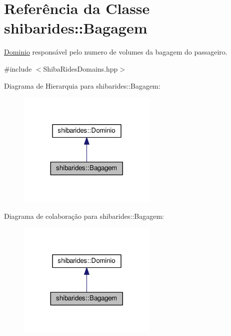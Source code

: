 \hypertarget{classshibarides_1_1Bagagem}{}\section{Referência da Classe shibarides\+:\+:Bagagem}
\label{classshibarides_1_1Bagagem}


\hyperlink{classshibarides_1_1Dominio}{Dominio} responsável pelo numero de volumes da bagagem do passageiro.  




{\ttfamily \#include $<$Shiba\+Rides\+Domains.\+hpp$>$}



Diagrama de Hierarquia para shibarides\+:\+:Bagagem\+:\nopagebreak
\begin{figure}[H]
\begin{center}
\leavevmode
\includegraphics[width=188pt]{classshibarides_1_1Bagagem__inherit__graph}
\end{center}
\end{figure}


Diagrama de colaboração para shibarides\+:\+:Bagagem\+:\nopagebreak
\begin{figure}[H]
\begin{center}
\leavevmode
\includegraphics[width=188pt]{classshibarides_1_1Bagagem__coll__graph}
\end{center}
\end{figure}
